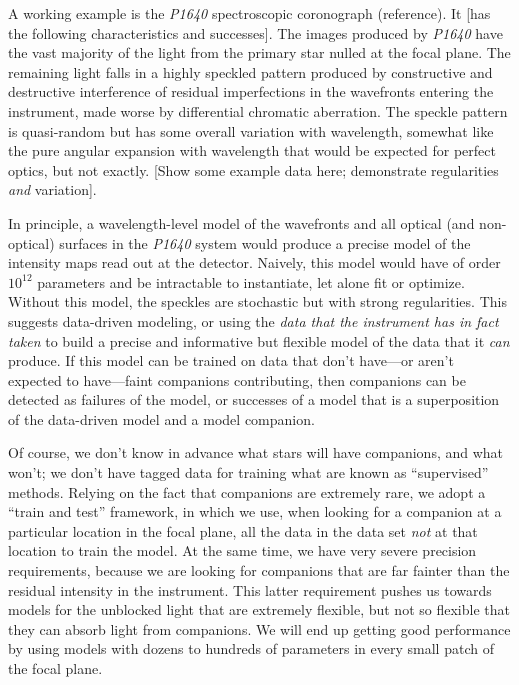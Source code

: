 \documentclass[12pt,pdftex,preprint]{aastex}
\newcommand{\project}[1]{\textsl{#1}}
\begin{document}
A working example is the \project{P1640} spectroscopic coronograph (reference).
It [has the following characteristics and successes].  The images
produced by \project{P1640} have the vast majority of the light from the primary
star nulled at the focal plane.  The remaining light falls in a highly
speckled pattern produced by constructive and destructive interference
of residual imperfections in the wavefronts entering the instrument,
made worse by differential chromatic aberration.  The speckle pattern
is quasi-random but has some overall variation with wavelength,
somewhat like the pure angular expansion with wavelength that would be
expected for perfect optics, but not exactly. [Show some example data
  here; demonstrate regularities \emph{and} variation].

In principle, a wavelength-level model of the wavefronts and all
optical (and non-optical) surfaces in the \project{P1640} system would produce a
precise model of the intensity maps read out at the detector.
Naively, this model would have of order $10^12$ parameters and be
intractable to instantiate, let alone fit or optimize.  Without this
model, the speckles are stochastic but with strong regularities.  This
suggests data-driven modeling, or using the \emph{data that the
  instrument has in fact taken} to build a precise and informative but
flexible model of the data that it \emph{can} produce.  If this model
can be trained on data that don't have---or aren't expected to
have---faint companions contributing, then companions can be detected
as failures of the model, or successes of a model that is a
superposition of the data-driven model and a model companion.

Of course, we don't know in advance what stars will have companions,
and what won't; we don't have tagged data for training what are known
as ``supervised'' methods.  Relying on the fact that companions are
extremely rare, we adopt a ``train and test'' framework, in which we
use, when looking for a companion at a particular location in the
focal plane, all the data in the data set \emph{not} at that location
to train the model.  At the same time, we have very severe precision
requirements, because we are looking for companions that are far
fainter than the residual intensity in the instrument.  This latter
requirement pushes us towards models for the unblocked light that are
extremely flexible, but not so flexible that they can absorb light
from companions.  We will end up getting good performance by using
models with dozens to hundreds of parameters in every small patch of
the focal plane.
\end{document}
